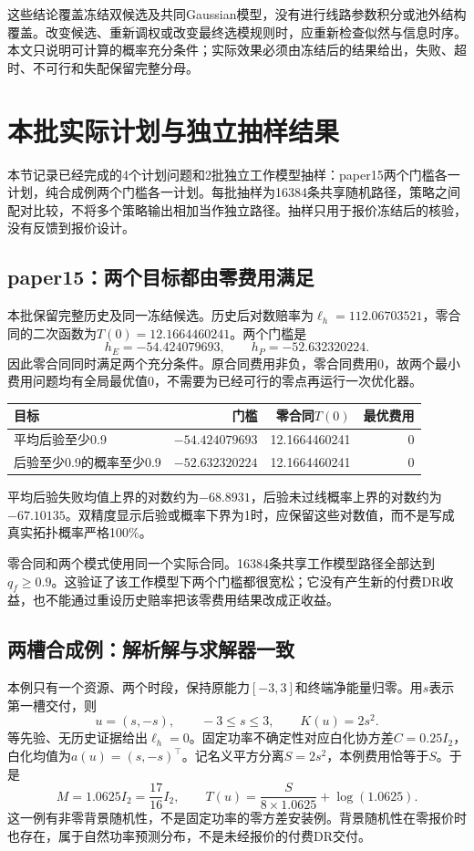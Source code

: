 \documentclass[UTF8,11pt,a4paper,fontset=fandol]{ctexart}
\numberwithin{equation}{section}
\begin{document}
这些结论覆盖冻结双候选及共同Gaussian模型，没有进行线路参数积分或池外结构覆盖。改变候选、重新调权或改变最终选模规则时，应重新检查似然与信息时序。本文只说明可计算的概率充分条件；实际效果必须由冻结后的结果给出，失败、超时、不可行和失配保留完整分母。

\section{本批实际计划与独立抽样结果}
\label{sec:results}
本节记录已经完成的4个计划问题和2批独立工作模型抽样：paper15两个门槛各一计划，纯合成例两个门槛各一计划。每批抽样为16384条共享随机路径，策略之间配对比较，不将多个策略输出相加当作独立路径。抽样只用于报价冻结后的核验，没有反馈到报价设计。

\subsection{paper15：两个目标都由零费用满足}
本批保留完整历史及同一冻结候选。历史后对数赔率为$\ell_h=112.06703521$，零合同的二次函数为$T(0)=12.1664460241$。两个门槛是
\begin{equation}
h_E=-54.424079693,\qquad h_P=-52.632320224.
\end{equation}
因此零合同同时满足两个充分条件。原合同费用非负，零合同费用0，故两个最小费用问题均有全局最优值0，不需要为已经可行的零点再运行一次优化器。

\begin{center}\small
\begin{tabular}{lrrr}\toprule
目标&门槛&零合同$T(0)$&最优费用\\\midrule
平均后验至少0.9&$-54.424079693$&12.1664460241&0\\
后验至少0.9的概率至少0.9&$-52.632320224$&12.1664460241&0\\\bottomrule
\end{tabular}
\end{center}
平均后验失败均值上界的对数约为$-68.8931$，后验未过线概率上界的对数约为$-67.10135$。双精度显示后验或概率下界为1时，应保留这些对数值，而不是写成真实拓扑概率严格100\%。

零合同和两个模式使用同一个实际合同。16384条共享工作模型路径全部达到$q_f\ge0.9$。这验证了该工作模型下两个门槛都很宽松；它没有产生新的付费DR收益，也不能通过重设历史赔率把该零费用结果改成正收益。

\subsection{两槽合成例：解析解与求解器一致}
本例只有一个资源、两个时段，保持原能力$[-3,3]$和终端净能量归零。用$s$表示第一槽交付，则
\begin{equation}
u=(s,-s),\qquad -3\le s\le3,
\qquad K(u)=2s^2.
\end{equation}
等先验、无历史证据给出$\ell_h=0$。固定功率不确定性对应白化协方差$C=0.25I_2$，白化均值为$a(u)=(s,-s)^\top$。记名义平方分离$S=2s^2$，本例费用恰等于$S$。于是
\begin{equation}
M=1.0625I_2=\frac{17}{16}I_2,
\qquad
\boxed{T(u)=\frac{S}{8\times1.0625}+\log(1.0625).}
\label{eq:toyT}
\end{equation}
这一例有非零背景随机性，不是固定功率的零方差安装例。背景随机性在零报价时也存在，属于自然功率预测分布，不是未经报价的付费DR交付。
\end{document}
